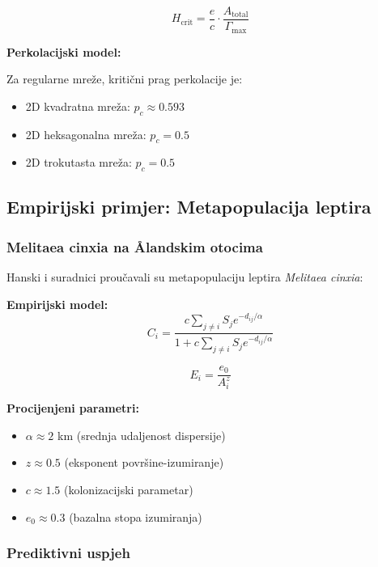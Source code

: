 \documentclass[11pt,oneside]{book}
\begin{document}
\begin{equation}
	H_{\text{crit}} = \frac{e}{c} \cdot \frac{A_{\text{total}}}{\Gamma_{\text{max}}}
\end{equation}

\textbf{Perkolacijski model:}

Za regularne mreže, kritični prag perkolacije je:
\begin{itemize}
	\item 2D kvadratna mreža: $p_c \approx 0.593$
	\item 2D heksagonalna mreža: $p_c = 0.5$
	\item 2D trokutasta mreža: $p_c = 0.5$
\end{itemize}

\subsection{Empirijski primjer: Metapopulacija leptira}

\subsubsection{Melitaea cinxia na Ålandskim otocima}

Hanski i suradnici proučavali su metapopulaciju leptira \textit{Melitaea cinxia}:

\textbf{Empirijski model:}
\begin{equation}
	C_i = \frac{c \sum_{j \neq i} S_j e^{-d_{ij}/\alpha}}{1 + c \sum_{j \neq i} S_j e^{-d_{ij}/\alpha}}
\end{equation}

\begin{equation}
	E_i = \frac{e_0}{A_i^z}
\end{equation}

\textbf{Procijenjeni parametri:}
\begin{itemize}
	\item $\alpha \approx 2$ km (srednja udaljenost dispersije)
	\item $z \approx 0.5$ (eksponent površine-izumiranje)
	\item $c \approx 1.5$ (kolonizacijski parametar)
	\item $e_0 \approx 0.3$ (bazalna stopa izumiranja)
\end{itemize}

\subsubsection{Prediktivni uspjeh}
\end{document}
